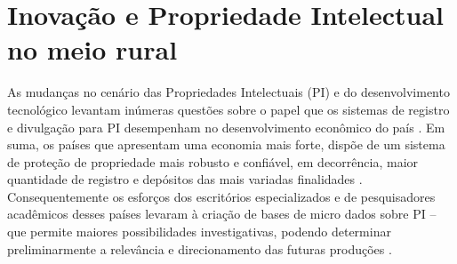 \section{Inovação e Propriedade Intelectual no meio rural}

As mudanças no cenário das Propriedades Intelectuais (PI) e do desenvolvimento tecnológico levantam inúmeras questões sobre o papel que os sistemas de registro e divulgação para PI desempenham no desenvolvimento econômico do país \cite{segala_os_2016}. Em suma, os países que apresentam uma economia mais forte, dispõe de um sistema de proteção de propriedade mais robusto e confiável, em decorrência, maior quantidade de registro e depósitos das mais variadas finalidades \cite{mueller_universidades_2014}. Consequentemente os esforços dos escritórios especializados e de pesquisadores acadêmicos desses países levaram à criação de bases de micro dados sobre PI – que permite maiores possibilidades investigativas, podendo determinar preliminarmente a relevância e direcionamento das futuras produções \cite{luna_impacto_2006}. 

\clearpage








